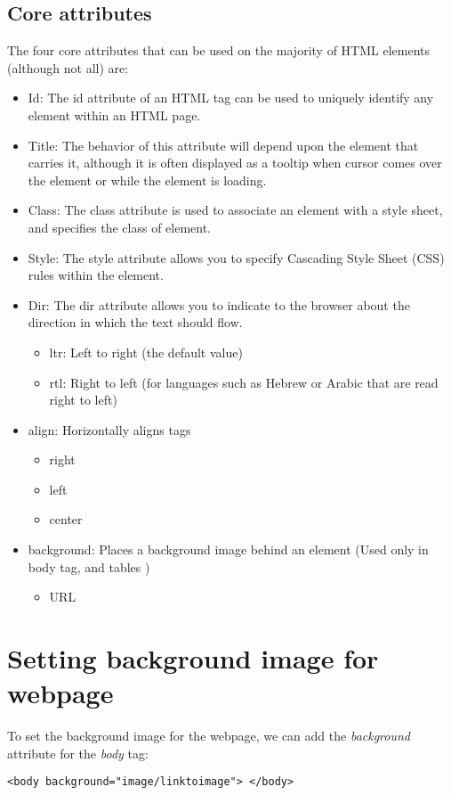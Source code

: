 \documentclass{report}
\begin{document}
    \subsection{Core attributes}
    \bigbreak \noindent 
    The four core attributes that can be used on the majority of HTML elements (although not all)
    are:
    \begin{itemize}
        \item Id: The id attribute of an HTML tag can be used to uniquely identify any element within an HTML page. 
        \item Title: The behavior of this attribute will depend upon the element that carries it, although it is often displayed as a tooltip when cursor comes over the element or while the element is loading.
        \item Class: The class attribute is used to associate an element with a style sheet, and specifies the class of element. 
        \item Style: The style attribute allows you to specify Cascading Style Sheet (CSS) rules within the element.
        \item Dir: The dir attribute allows you to indicate to the browser about the direction in which the text should flow. 
            \begin{itemize}
                \item ltr: Left to right (the default value)
                \item rtl: Right to left (for languages such as Hebrew or Arabic that are read right to left)
            \end{itemize}
        \item align: Horizontally aligns tags
            \begin{itemize}
                \item right
                \item left
                \item center
            \end{itemize}
    \item background: Places a background image behind an element (Used only in body tag, and tables )
        \begin{itemize}
            \item URL
        \end{itemize}
    \end{itemize}

    \bigbreak \noindent 
    \section{\LARGE Setting background image for webpage}
    \bigbreak \noindent 
    To set the background image for the webpage, we can add the \textit{background} attribute for the \textit{body} tag:
    \bigbreak \noindent 
    \sepline
    \begin{verbatim}
<body background="image/linktoimage"> </body>
    \end{verbatim}
    \sepline
\end{document}
